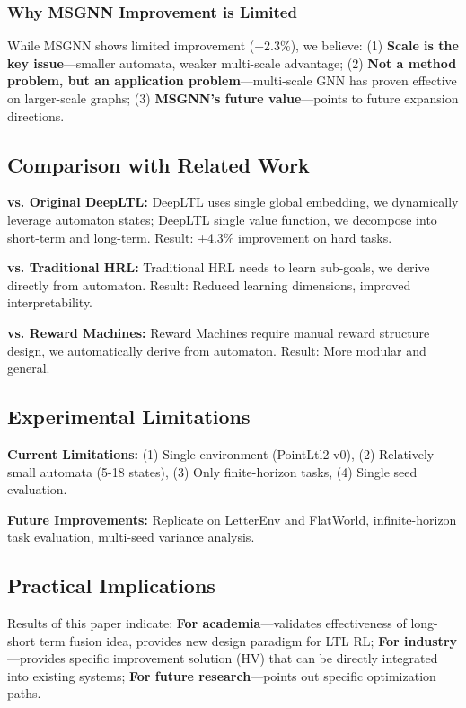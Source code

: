 \documentclass[conference]{IEEEtran}
\begin{document}
\subsubsection{Why MSGNN Improvement is Limited}

While MSGNN shows limited improvement (+2.3\%), we believe: (1) \textbf{Scale is the key issue}---smaller automata, weaker multi-scale advantage; (2) \textbf{Not a method problem, but an application problem}---multi-scale GNN has proven effective on larger-scale graphs; (3) \textbf{MSGNN's future value}---points to future expansion directions.

\subsection{Comparison with Related Work}

\textbf{vs. Original DeepLTL:} DeepLTL uses single global embedding, we dynamically leverage automaton states; DeepLTL single value function, we decompose into short-term and long-term. Result: +4.3\% improvement on hard tasks.

\textbf{vs. Traditional HRL:} Traditional HRL needs to learn sub-goals, we derive directly from automaton. Result: Reduced learning dimensions, improved interpretability.

\textbf{vs. Reward Machines:} Reward Machines require manual reward structure design, we automatically derive from automaton. Result: More modular and general.

\subsection{Experimental Limitations}

\textbf{Current Limitations:} (1) Single environment (PointLtl2-v0), (2) Relatively small automata (5-18 states), (3) Only finite-horizon tasks, (4) Single seed evaluation.

\textbf{Future Improvements:} Replicate on LetterEnv and FlatWorld, infinite-horizon task evaluation, multi-seed variance analysis.

\subsection{Practical Implications}

Results of this paper indicate: \textbf{For academia}---validates effectiveness of long-short term fusion idea, provides new design paradigm for LTL RL; \textbf{For industry}---provides specific improvement solution (HV) that can be directly integrated into existing systems; \textbf{For future research}---points out specific optimization paths.
\end{document}

